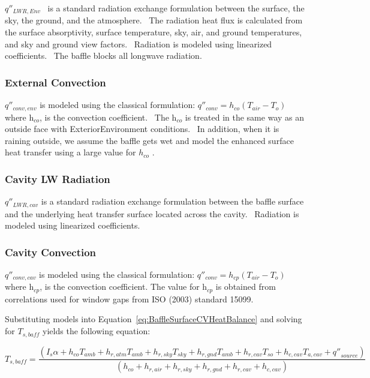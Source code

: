 \({q''_{LWR,Env}}\) ~is a standard radiation exchange formulation between the surface, the sky, the ground, and the atmosphere.~ The radiation heat flux is calculated from the surface absorptivity, surface temperature, sky, air, and ground temperatures, and sky and ground view factors.~ Radiation is modeled using linearized coefficients. ~The baffle blocks all longwave radiation.

\subsubsection{External Convection}\label{external-convection}

\(q''_{conv,env}\) is modeled using the classical formulation: \(q''_{conv} = h_{co}(T_{air} - T_{o})\) where h\(_{co}\), is the convection coefficient.~ The h\(_{co}\) is treated in the same way as an outside face with ExteriorEnvironment conditions.~ In addition, when it is raining outside, we assume the baffle gets wet and model the enhanced surface heat transfer using a large value for \({h_{co}}\) .

\subsubsection{Cavity LW Radiation}\label{cavity-lw-radiation}

\({q''_{LWR,cav}}\) is a standard radiation exchange formulation between the baffle surface and the underlying heat transfer surface located across the cavity.~ Radiation is modeled using linearized coefficients.

\subsubsection{Cavity Convection}\label{cavity-convection}

\(q''_{conv,cav}\) is modeled using the classical formulation: \(q''_{conv} = h_{cp}(T_{air} - T_{o})\) where h\(_{cp}\), is the convection coefficient. The value for h\(_{cp}\) is obtained from correlations used for window gaps from ISO (2003) standard 15099.

Substituting models into Equation~\ref{eq:BaffleSurfaceCVHeatBalance} and solving for \({T_{s,baff}}\) yields the following equation:

\begin{equation}
{T_{s,baff}} = \frac{{\left( {{I_s}\alpha  + {h_{co}}{T_{amb}} + {h_{r,atm}}{T_{amb}} + {h_{r,sky}}{T_{sky}} + {h_{r,gnd}}{T_{amb}} + {h_{r,cav}}{T_{so}} + {h_{c,cav}}{T_{a,cav}} + {{q''}_{source}}} \right)}}{{\left( {{h_{co}} + {h_{r,air}} + {h_{r,sky}} + {h_{r,gnd}} + {h_{r,cav}} + {h_{c,cav}}} \right)}}
\end{equation}

